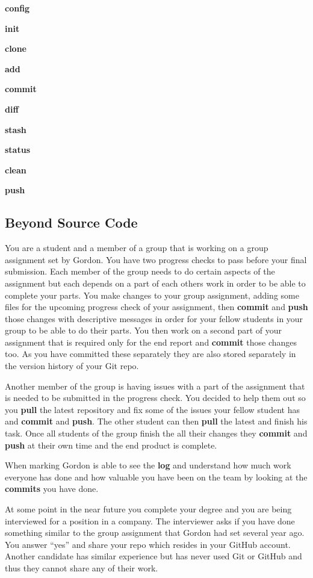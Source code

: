 \documentclass[
]{book}
\begin{document}
\textbf{config}

\textbf{init}

\textbf{clone}

\textbf{add}

\textbf{commit}

\textbf{diff}

\textbf{stash}

\textbf{status}

\textbf{clean}

\textbf{push}

\hypertarget{beyond-source-code}{%
\subsection{Beyond Source Code}\label{beyond-source-code}}

You are a student and a member of a group that is working on a group assignment set by Gordon. You have two progress checks to pass before your final submission.
Each member of the group needs to do certain aspects of the assignment but each depends on a part of each others work in order to be able to complete your parts.
You make changes to your group assignment, adding some files for the upcoming progress check of your assignment, then \textbf{commit} and \textbf{push} those changes with descriptive messages in order for your fellow students in your group to be able to do their parts. You then work on a second part of your assignment that is required only for the end report and \textbf{commit} those changes too. As you have committed these separately they are also stored separately in the version history of your Git repo.

Another member of the group is having issues with a part of the assignment that is needed to be submitted in the progress check. You decided to help them out so you \textbf{pull} the latest repository and fix some of the issues your fellow student has and \textbf{commit} and \textbf{push}. The other student can then \textbf{pull} the latest and finish his task. Once all students of the group finish the
all their changes they \textbf{commit} and \textbf{push} at their own time and the end product is complete.

When marking Gordon is able to see the \textbf{log} and understand how much work everyone has done and how valuable you have been on the team by looking at the \textbf{commits} you have done.

At some point in the near future you complete your degree and you are being interviewed for a position in a company.
The interviewer asks if you have done something similar to the group assignment that Gordon had set several year ago. You answer ``yes'' and share your repo which resides in your GitHub account.
Another candidate has similar experience but has never used Git or GitHub and thus they cannot share any of their work.
\end{document}
